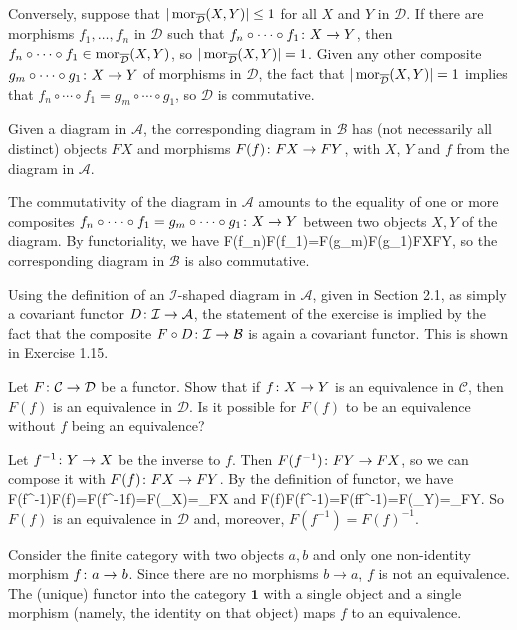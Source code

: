 Conversely, suppose that $|\operatorname{mor}_{\overline{\mathcal{D}}}(X,Y)|\leq 1$ for all $X$ and $Y$ in $\mathcal{D}$. If there are morphisms $f_1,\ldots,f_n$ in $\mathcal{D}$ such that $f_n\circ\cdots\circ f_1\colon X\to Y$, then $f_n\circ\cdots\circ f_1\in\operatorname{mor}_{\overline{\mathcal{D}}}(X,Y)$, so $|\operatorname{mor}_{\overline{\mathcal{D}}}(X,Y)|=1$. Given any other composite $g_m\circ\cdots\circ g_1\colon X\to Y$ of morphisms in $\mathcal{D}$, the fact that $|\operatorname{mor}_{\overline{\mathcal{D}}}(X,Y)|=1$ implies that $f_n\circ\cdots\circ f_1=g_m\circ\cdots\circ g_1$, so $\mathcal{D}$ is commutative.
\item Given a diagram in $\mathcal{A}$, the corresponding diagram in $\mathcal{B}$ has (not necessarily all distinct) objects $FX$ and morphisms $F(f)\colon FX\to FY$, with $X$, $Y$ and $f$ from the diagram in $\mathcal{A}$.

The commutativity of the diagram in $\mathcal{A}$ amounts to the equality of one or more composites $f_n\circ \cdots \circ f_1=g_m\circ \cdots \circ g_1\colon X\to Y$ between two objects $X,Y$ of the diagram. By functoriality, we have
\bse
F(f_n)\circ \cdots \circ F(f_1)=F(g_m)\circ \cdots \circ F(g_1)\cl FX\to FY,
\ese
so the corresponding diagram in $\mathcal{B}$ is also commutative.

Using the definition of an $\mathcal{I}$-shaped diagram in $\mathcal{A}$, given in Section 2.1, as simply a covariant functor $D\colon\mathcal{I}\to\mathcal{A}$, the statement of the exercise is implied by the fact that the composite $F\circ D\colon\mathcal{I}\to\mathcal{B}$ is again a covariant functor. This is shown in Exercise 1.15. 
\een
\es

\bp
Let $F \colon \mathcal{C} \to \mathcal{D}$ be a functor. Show that if $f \colon X \to Y$ is an equivalence in $\mathcal{C}$, then $F(f)$ is an equivalence in $\mathcal{D}$. Is it possible for $F(f)$ to be an equivalence without $f$ being an equivalence?
\ep

\bs
Let $f^{-1}\colon Y\to X$ be the inverse to $f$. Then $F(f^{-1})\colon FY\to FX$, so we can compose it with $F(f)\colon FX\to FY$. By the definition of functor, we have
\bse
F(f^{-1})\circ F(f)=F(f^{-1}\circ f)=F(\id_X)=\id_{FX}
\ese
and
\bse
F(f)\circ F(f^{-1})=F(f\circ f^{-1})=F(\id_Y)=\id_{FY}.
\ese
So $F(f)$ is an equivalence in $\mathcal{D}$ and, moreover, $F(f^{-1})=F(f)^{-1}$.

Consider the finite category with two objects $a,b$ and only one non-identity morphism $f\colon a\to b$. Since there are no morphisms $b\to a$, $f$ is not an equivalence. The (unique) functor into the category $\mathbf{1}$ with a single object and a single morphism (namely, the identity on that object) maps $f$ to an equivalence.
\es

